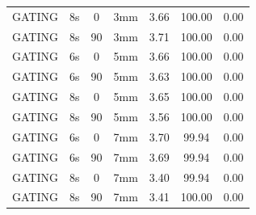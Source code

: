 \documentclass[type=dr, dr=rernat, accentcolor=tud7b,colorbacktitle, bigchapter, openright, twoside, 12pt ]{tudthesis}
\begin{document}
\begin{table}[H]
\begin{tabular}{|c||c|c|c||c|c|c|}
GATING & 8s & 0 & 3mm & 3.66 & 100.00 & 0.00 \\
GATING & 8s & 90 & 3mm & 3.71 & 100.00 & 0.00 \\
GATING & 6s & 0 & 5mm & 3.66 & 100.00 & 0.00 \\
GATING & 6s & 90 & 5mm & 3.63 & 100.00 & 0.00 \\
GATING & 8s & 0 & 5mm & 3.65 & 100.00 & 0.00 \\
GATING & 8s & 90 & 5mm & 3.56 & 100.00 & 0.00 \\
GATING & 6s & 0 & 7mm & 3.70 & 99.94 & 0.00 \\
GATING & 6s & 90 & 7mm & 3.69 & 99.94 & 0.00 \\
GATING & 8s & 0 & 7mm & 3.40 & 99.94 & 0.00 \\
GATING & 8s & 90 & 7mm & 3.41 & 100.00 & 0.00 \\
    \hline\hline 
  \end{tabular}
\end{table}

\newpage
\end{document}
